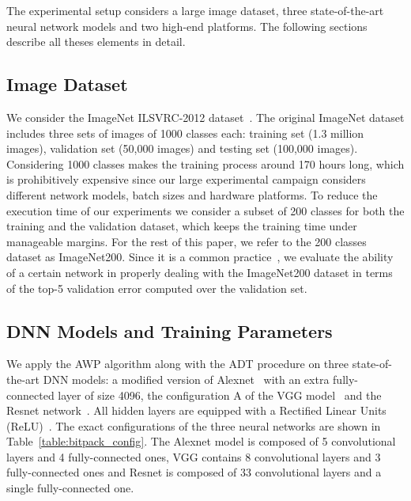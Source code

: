 The experimental setup considers a large image dataset, three state-of-the-art 
neural network models and two high-end platforms.
The following sections describe all theses elements in detail.

\subsection{Image Dataset}
We consider the ImageNet ILSVRC-2012 dataset~\cite{imagenet}.
The original ImageNet dataset includes three sets of images of 1000 classes 
each:
training set (1.3 million images), validation set (50,000 images) and
testing set (100,000 images).
Considering 1000 classes makes the training process around 170 hours long, which 
is prohibitively expensive since our large experimental campaign considers 
different network models, batch sizes and hardware platforms.
To reduce the execution time of our experiments we consider a subset of 200 
classes for both the training and the validation dataset, which keeps the 
training time under manageable margins.
For the rest of this paper, we refer to the 200 classes dataset as ImageNet200.
Since it is a common practice~\cite{vgg}, we evaluate the ability of a certain 
network in properly dealing with the ImageNet200 dataset in terms of the top-5 
validation error computed over the validation set.

\subsection{DNN Models and Training Parameters}
We apply the AWP algorithm along with the ADT procedure on three 
state-of-the-art DNN models: a modified version of Alexnet~\cite{alexnet} with 
an extra fully-connected layer of size 4096, the configuration A of the VGG 
model~\cite{vgg} and the Resnet network~\cite{resnet}.  All hidden layers are 
equipped with a Rectified Linear Units (ReLU)~\cite{alexnet}.
The exact configurations of the three neural networks are shown in 
Table~\ref{table:bitpack_config}.  The Alexnet model is composed of 5 convolutional 
layers and 4 fully-connected ones, VGG contains 8 convolutional layers and 3 
fully-connected ones and Resnet is composed of 33 convolutional layers and a 
single fully-connected one.


